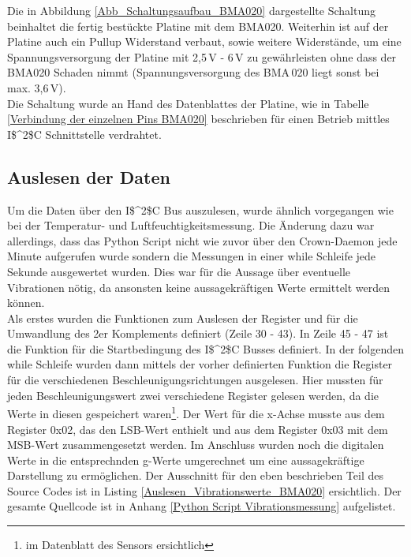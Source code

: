 Die in Abbildung \ref{Abb_Schaltungsaufbau_BMA020} dargestellte Schaltung beinhaltet die fertig bestückte Platine mit dem BMA020. Weiterhin ist auf der Platine auch ein Pullup Widerstand verbaut, sowie weitere Widerstände, um eine Spannungsversorgung der Platine mit 2,5\,V - 6\,V zu gewährleisten ohne dass der BMA020 Schaden nimmt (Spannungsversorgung des BMA\,020 liegt sonst bei max. 3,6\,V).\\
Die Schaltung wurde an Hand des Datenblattes der Platine, wie in Tabelle \ref{Verbindung der einzelnen Pins BMA020} beschrieben für einen Betrieb mittles \ac{I$^2$C} Schnittstelle verdrahtet. 

\subsection{Auslesen der Daten}
\label{subsection_Auslesen_Daten_BMA020}

Um die Daten über den \ac{I$^2$C} Bus auszulesen, wurde ähnlich vorgegangen wie bei der Temperatur- und Luftfeuchtigkeitsmessung. Die Änderung dazu war allerdings, dass das Python Script nicht wie zuvor über den Crown-Daemon jede Minute aufgerufen wurde sondern die Messungen in einer while Schleife jede Sekunde ausgewertet wurden. Dies war für die Aussage über eventuelle Vibrationen nötig, da ansonsten keine aussagekräftigen Werte ermittelt werden können.\\
Als erstes wurden die Funktionen zum Auslesen der Register und für die Umwandlung des 2er Komplements definiert (Zeile 30 - 43). In Zeile 45 - 47 ist die Funktion für die Startbedingung des \ac{I$^2$C} Busses definiert. In der folgenden while Schleife wurden dann mittels der vorher definierten Funktion die Register für die verschiedenen Beschleunigungsrichtungen ausgelesen. Hier mussten für jeden Beschleunigungswert zwei verschiedene Register gelesen werden, da die Werte in diesen gespeichert waren\footnote{im Datenblatt des Sensors ersichtlich}. Der Wert für die x-Achse musste aus dem Register 0x02, das den LSB-Wert enthielt und aus dem Register 0x03 mit dem MSB-Wert zusammengesetzt werden.
Im Anschluss wurden noch die digitalen Werte in die entsprechnden g-Werte umgerechnet um eine aussagekräftige Darstellung zu ermöglichen. Der Ausschnitt für den eben beschrieben Teil des Source Codes ist in Listing \ref{Auslesen_Vibrationswerte_BMA020} ersichtlich. Der gesamte Quellcode ist in Anhang \ref{Python Script Vibrationsmessung} aufgelistet.



